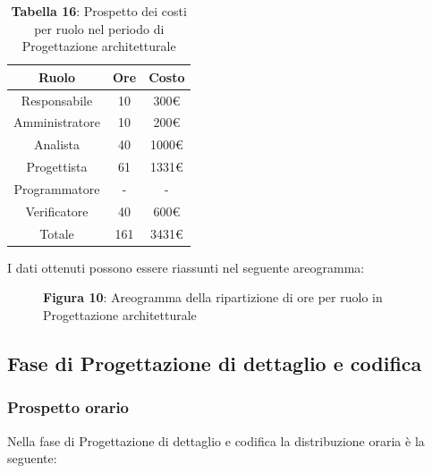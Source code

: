 \begin{table}[H]
	\centering
	\renewcommand{\arraystretch}{1.5}
	\begin{tabular}{|c|c|c|}
		\hline
		\rowcolor{lighter-grayer}
		Ruolo & Ore & Costo \\
		\hline
		Responsabile & 10 & 300\euro \\%
		\hline
		Amministratore & 10 & 200\euro \\%
		\hline
		Analista & 40 & 1000\euro \\%
		\hline
		Progettista & 61 & 1331\euro \\%
		\hline
		Programmatore & - & - \\%
		\hline
		Verificatore & 40 & 600\euro \\%
		\hline
		Totale & 161 &  3431\euro \\
		\hline
	\end{tabular}
	\caption*{\textbf{Tabella 16}: Prospetto dei costi per ruolo nel periodo di Progettazione architetturale\\}
\end{table}

I dati ottenuti possono essere riassunti nel seguente areogramma:


\begin{figure}[H]
	\centering
	\caption*{\textbf{Figura 10}: Areogramma della ripartizione di ore per ruolo in Progettazione architetturale}
	\label{fig:Figura10}
\end{figure}



\subsection{Fase di Progettazione di dettaglio e codifica}
\subsubsection{Prospetto orario}
Nella fase di Progettazione di dettaglio e codifica la distribuzione oraria è la seguente:

